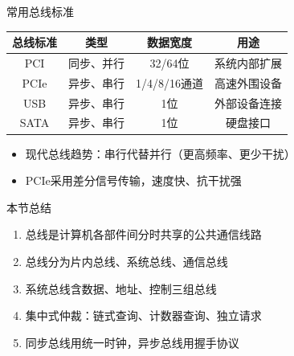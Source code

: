 \documentclass[10pt, aspectratio=169]{beamer}
\begin{document}
\begin{frame}{常用总线标准}
    \begin{center}
        \begin{tabular}{|c|c|c|c|}
            \hline
            \textbf{总线标准} & \textbf{类型} & \textbf{数据宽度} & \textbf{用途} \\
            \hline
            PCI & 同步、并行 & 32/64位 & 系统内部扩展 \\
            PCIe & 异步、串行 & 1/4/8/16通道 & 高速外围设备 \\
            USB & 异步、串行 & 1位 & 外部设备连接 \\
            SATA & 异步、串行 & 1位 & 硬盘接口 \\
            \hline
        \end{tabular}
    \end{center}
    \vspace{0.5em}
    \begin{itemize}
        \item 现代总线趋势：串行代替并行（更高频率、更少干扰）
        \item PCIe采用差分信号传输，速度快、抗干扰强
    \end{itemize}
\end{frame}

\begin{frame}{本节总结}
    \begin{enumerate}
        \item 总线是计算机各部件间分时共享的公共通信线路
        \item 总线分为片内总线、系统总线、通信总线
        \item 系统总线含数据、地址、控制三组总线
        \item 集中式仲裁：链式查询、计数器查询、独立请求
        \item 同步总线用统一时钟，异步总线用握手协议
    \end{enumerate}
\end{frame}
\end{document}
